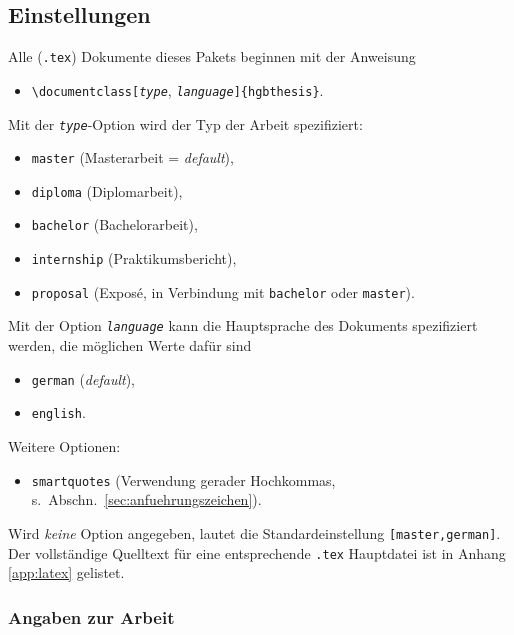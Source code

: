 \subsection{Einstellungen}
\label{sec:HagenbergEinstellungen}

Alle (\verb!.tex!) Dokumente dieses Pakets beginnen mit der Anweisung
%
\begin{itemize}
    \item[] \verb!\documentclass[!\texttt{\emph{type}},
    \texttt{\emph{language}}\verb!]{hgbthesis}!.
\end{itemize}
%
Mit der \texttt{\emph{type}}-Option wird der Typ der Arbeit spezifiziert:
%
\begin{itemize}
    \item[] \texttt{master} (Masterarbeit = \emph{default}),
    \item[] \texttt{diploma} (Diplomarbeit),
    \item[] \texttt{bachelor} (Bachelorarbeit),
    \item[] \texttt{internship} (Praktikumsbericht),
		\item[] \texttt{proposal} (Exposé, in Verbindung mit \texttt{bachelor} oder \texttt{master}).
\end{itemize}
%
Mit der Option \texttt{\emph{language}} kann die Hauptsprache des Dokuments
spezifiziert werden, die möglichen Werte dafür sind
%
\begin{itemize}
    \item[] \texttt{german} (\emph{default}),
    \item[] \texttt{english}.
\end{itemize}
%
Weitere Optionen:
%
\begin{itemize}
    \item[] \texttt{smartquotes} (Verwendung gerader Hochkommas,
	s.\ Abschn.~\ref{sec:anfuehrungszeichen}).
\end{itemize}
%
Wird \emph{keine} Option angegeben, lautet die Standardeinstellung
\texttt{[master,german]}. Der vollständige Quelltext für eine entsprechende
\verb!.tex! Hauptdatei ist in Anhang \ref{app:latex} gelistet.

\subsubsection{Angaben zur Arbeit}

